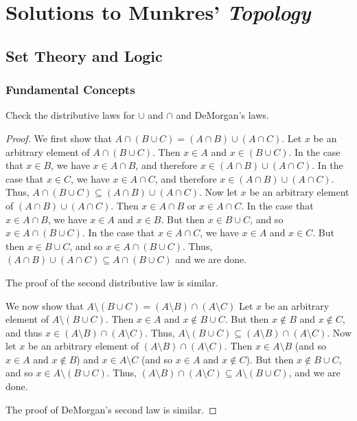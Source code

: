 \chapter{Solutions to Munkres' \emph{Topology}}

\section{Set Theory and Logic}

\subsection{Fundamental Concepts}

\begin{exercise}
	Check the distributive laws for $\cup$ and $\cap$ and 
	DeMorgan's laws.
\end{exercise}

\begin{proof}
	We first show that $A \cap (B \cup C) = (A \cap B) \cup (A \cap 
	C)$. Let $x$ be an arbitrary element of $A \cap (B \cup C)$. 
	Then $x \in A$ and $x \in (B \cup C)$. In the case that $x \in 
	B$, we have $x \in A \cap B$, and therefore $x \in (A \cap B) 
	\cup (A \cap C)$. In the case that $x \in C$, we have $x \in A 
	\cap C$, and therefore $x \in (A \cap B) \cup (A \cap C)$. 
	Thus, $A \cap (B \cup C) \subseteq (A \cap B) \cup (A \cap C)$. 
	Now let $x$ be an arbitrary element of $(A \cap B) \cup (A \cap 
	C)$. Then $x \in A \cap B$ or $x \in A \cap C$. In the case 
	that $x \in A \cap B$, we have $x \in A$ and $x \in B$. But 
	then $x \in B \cup C$, and so $x \in A \cap (B \cup C)$. In the 
	case that $x \in A \cap C$, we have $x \in A$ and $x \in C$. 
	But then $x \in B \cup C$, and so $x \in A \cap (B \cup C)$. 
	Thus, $(A \cap B) \cup (A \cap C) \subseteq A \cap (B \cup C)$ 
	and we are done.
	
	The proof of the second distributive law is similar.
	
	We now show that $A \setminus (B \cup C) = (A \setminus B) \cap 
	(A \setminus C)$ Let $x$ be an arbitrary element of $A 
	\setminus (B \cup C)$. Then $x \in A$ and $x \notin B \cup C$. 
	But then $x \notin B$ and $x \notin C$, and thus $x \in (A 
	\setminus B) \cap (A \setminus C)$. Thus, $A \setminus (B \cup 
	C) \subseteq (A \setminus B) \cap (A \setminus C)$. Now let $x$ 
	be an arbitrary element of $(A \setminus B) \cap (A \setminus 
	C)$. Then $x \in A \setminus B$ (and so $x \in A$ and $x \notin 
	B$) and $x \in A \setminus C$ (and so $x \in A$ and $x \notin 
	C$). But then $x \notin B \cup C$, and so $x \in A \setminus (B 
	\cup C)$. Thus, $(A \setminus B) \cap (A \setminus C) \subseteq 
	A \setminus (B \cup C)$, and we are done.
	
	The proof of DeMorgan's second law is similar.
\end{proof}

